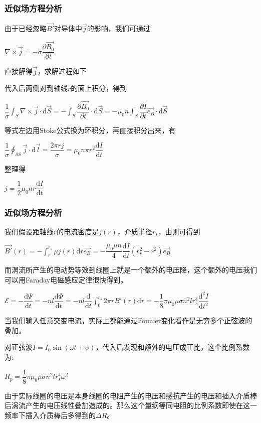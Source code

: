 \documentclass[11pt]{beamer}                                                                                               \usetheme{Boadilla}
\begin{document}
	\begin{frame}[fragile]
		\frametitle{近似场方程分析}
		由于已经忽略$\vec{B'}$对导体中$\vec{j}$的影响，我们可通过
		
		\centerline{$\nabla \times \vec{j}=-\sigma \dfrac{\partial \vec{B_0}}{\partial t}$}
		
		直接解得$\vec{j}$，求解过程如下
		
	
		代入后两侧对到轴线$r$的面上积分，得到
		
		\centerline{$\dfrac{1}{\sigma} \displaystyle\int_{ S}\nabla \times \vec{j} \cdot \mathrm{d}\vec{S}=-\displaystyle\int_{ S} \dfrac{\partial \vec{B_0}}{\partial t}\cdot \mathrm{d}\vec{S}=-\mu_0 n\displaystyle\int_{ S} \dfrac{\partial I}{\partial t} \vec{e_B} \cdot \mathrm{d}\vec{S}$}
		
		等式左边用Stoke公式换为环积分，再直接积分出来，有
		
		\centerline{$\dfrac{1}{\sigma} \displaystyle\oint_{\partial S} \vec{j} \cdot \mathrm{d}\vec{l}=\dfrac{2 \pi r j}{\sigma}=\mu_0 n \pi r^2 \dfrac{\mathrm{d}I}{\mathrm{d} t}$}
		
		整理得
		\centerline{$j=\dfrac{1}{2} \mu_0 n r \dfrac{\mathrm{d}I}{\mathrm{d} t}$} 
	\end{frame}
	
	\begin{frame}[fragile]
		\frametitle{近似场方程分析}
			我们假设距轴线$r$的电流密度是$j(r)$，介质半径$r_s$，由则可得到
		
		\centerline{$\vec{B'}(r)=-\displaystyle \int_{r}^{r_s} \mu j(r) \mathrm{d} r \vec{e_B}=-\dfrac{\mu_0 \mu n}{4} \dfrac{\mathrm{d}I}{\mathrm{d} t}(r_s^2-r^2)\vec{e_B}$}
		
		而涡流所产生的电动势等效到线圈上就是一个额外的电压降，这个额外的电压我们可以用Faraday电磁感应定律很快得到。
		\centerline{$\mathcal{E}=-\dfrac{\mathrm{d}\varPsi}{\mathrm{d} t}=-nl\dfrac{\mathrm{d}\varPhi}{\mathrm{d} t}=-nl\dfrac{\mathrm{d}}{\mathrm{d} t}\displaystyle \int_{0}^{r_s}2 \pi r B'(r)\mathrm{d} r=-\dfrac{1}{8}\pi \mu_0 \mu \sigma n^2 l r_s^4\dfrac{\mathrm{d}^2I}{\mathrm{d} t^2}$}
		
		当我们输入任意交变电流，实际上都能通过Founier变化看作是无穷多个正弦波的叠加。
		
		对正弦波$I=I_0 \sin(\omega t +\phi)$，代入后发现和额外的电压成正比，这个比例系数为:
		\centerline{$R_p=\dfrac{1}{8}\pi \mu_0 \mu \sigma n^2 l r_s^4 \omega^2$}
		
		由于实际线圈的电压是本身线圈的电阻产生的电压和感抗产生的电压和插入介质棒后涡流产生的电压线性叠加造成的。那么这个量纲等同电阻的比例系数即使在这一频率下插入介质棒后多得到的$\Delta R$。
	\end{frame}
	
\end{document}
